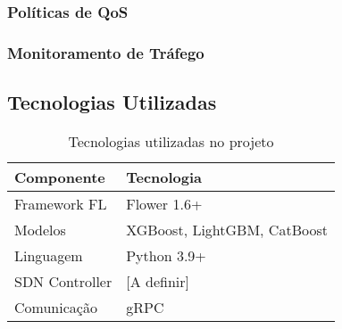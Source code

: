\subsubsection{Políticas de QoS}

\subsubsection{Monitoramento de Tráfego}

\subsection{Tecnologias Utilizadas}

\begin{table}[H]
\centering
\begin{tabularx}{\textwidth}{|l|X|}
\hline
\bf Componente & \bf Tecnologia \\ \hline
Framework FL & Flower 1.6+ \\ \hline
Modelos & XGBoost, LightGBM, CatBoost \\ \hline
Linguagem & Python 3.9+ \\ \hline
SDN Controller & [A definir] \\ \hline
Comunicação & gRPC \\ \hline
\end{tabularx}
\caption{Tecnologias utilizadas no projeto}
\label{tab:tecnologias}
\end{table}
